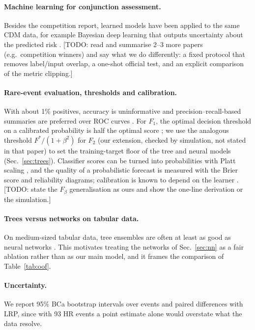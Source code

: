 \documentclass[clean,twocolumn]{bam-proposal}
\newcommand{\todo}[1]{{\color{red}[TODO: #1]}}
\begin{document}
\paragraph{Machine learning for conjunction assessment.}
Besides the competition report, learned models have been applied to the same CDM data, for example Bayesian deep learning that outputs uncertainty about the predicted risk \citep{pinto2020towards}. \todo{read and summarise 2--3 more papers (e.g.\ competition winners) and say what we do differently: a fixed protocol that removes label/input overlap, a one-shot official test, and an explicit comparison of the metric clipping.}

\paragraph{Rare-event evaluation, thresholds and calibration.}
With about 1\% positives, accuracy is uninformative and precision--recall-based summaries are preferred over ROC curves \citep{saito2015precision}. For $F_1$, the optimal decision threshold on a calibrated probability is half the optimal score \citep{lipton2014optimal}; we use the analogous threshold $F^*/(1+\beta^2)$ for $F_2$ (our extension, checked by simulation, not stated in that paper) to set the training-target floor of the tree and neural models (Sec.~\ref{sec:trees}). Classifier scores can be turned into probabilities with Platt scaling \citep{platt1999probabilistic}, and the quality of a probabilistic forecast is measured with the Brier score \citep{brier1950verification} and reliability diagrams; calibration is known to depend on the learner \citep{niculescu2005predicting}. \todo{state the $F_\beta$ generalisation as ours and show the one-line derivation or the simulation.}

\paragraph{Trees versus networks on tabular data.}
On medium-sized tabular data, tree ensembles are often at least as good as neural networks \citep{grinsztajn2022tree,shwartz2022tabular}. This motivates treating the networks of Sec.~\ref{sec:nn} as a fair ablation rather than as our main model, and it frames the comparison of Table~\ref{tab:oof}.

\paragraph{Uncertainty.}
We report 95\% BCa bootstrap intervals \citep{efron1987bca} over events and paired differences with LRP, since with 93 HR events a point estimate alone would overstate what the data resolve.
\end{document}
